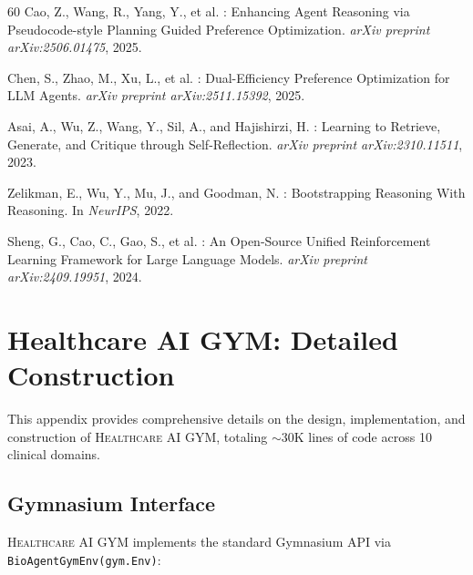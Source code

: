 \documentclass{article}
\newcommand{\gym}{\textsc{Healthcare AI GYM}}
\begin{document}
\begin{thebibliography}{60}
Cao, Z., Wang, R., Yang, Y., et al.
: Enhancing Agent Reasoning via Pseudocode-style Planning Guided Preference Optimization.
\newblock \emph{arXiv preprint arXiv:2506.01475}, 2025.

Chen, S., Zhao, M., Xu, L., et al.
: Dual-Efficiency Preference Optimization for {LLM} Agents.
\newblock \emph{arXiv preprint arXiv:2511.15392}, 2025.

Asai, A., Wu, Z., Wang, Y., Sil, A., and Hajishirzi, H.
: Learning to Retrieve, Generate, and Critique through Self-Reflection.
\newblock \emph{arXiv preprint arXiv:2310.11511}, 2023.

Zelikman, E., Wu, Y., Mu, J., and Goodman, N.
: Bootstrapping Reasoning With Reasoning.
\newblock In \emph{NeurIPS}, 2022.

Sheng, G., Cao, C., Gao, S., et al.
: An Open-Source Unified Reinforcement Learning Framework for Large Language Models.
\newblock \emph{arXiv preprint arXiv:2409.19951}, 2024.

\end{thebibliography}

\appendix

\section{Healthcare AI GYM: Detailed Construction}
\label{Appendix:AI_healthcare_gym}

This appendix provides comprehensive details on the design, implementation, and construction of \gym{}, totaling $\sim$30K lines of code across 10 clinical domains.

\subsection{Gymnasium Interface}

\gym{} implements the standard Gymnasium API via \texttt{BioAgentGymEnv(gym.Env)}:
\end{document}
